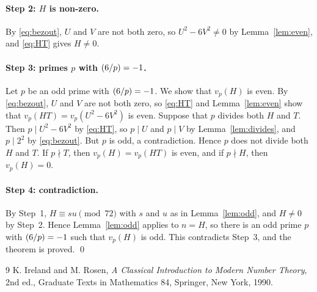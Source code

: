 \documentclass[11pt]{article}
\newcommand{\leg}[2]{\mathchoice{\biggl(\dfrac{#1}{#2}\biggr)}{(#1/#2)}{(#1/#2)}{(#1/#2)}}
\begin{document}
\paragraph{Step 2: $H$ is non-zero.} By \eqref{eq:bezout}, $U$ and $V$ are not both zero, so $U^2-6V^2\neq0$ by Lemma~\ref{lem:even}, and \eqref{eq:HT} gives $H\neq0$.

\paragraph{\texorpdfstring{Step 3: primes $p$ with $\leg{6}{p}=-1$.}{Step 3: inert primes.}} Let $p$ be an odd prime with $\leg{6}{p}=-1$. We show that $v_p(H)$ is even. By \eqref{eq:bezout}, $U$ and $V$ are not both zero, so \eqref{eq:HT} and Lemma~\ref{lem:even} show that $v_p(HT)=v_p(U^2-6V^2)$ is even. Suppose that $p$ divides both $H$ and $T$. Then $p\mid U^2-6V^2$ by \eqref{eq:HT}, so $p\mid U$ and $p\mid V$ by Lemma~\ref{lem:divides}, and $p\mid 2^{2}$ by \eqref{eq:bezout}. But $p$ is odd, a contradiction. Hence $p$ does not divide both $H$ and $T$. If $p\nmid T$, then $v_p(H)=v_p(HT)$ is even, and if $p\nmid H$, then $v_p(H)=0$.

\paragraph{Step 4: contradiction.} By Step~1, $H\equiv su\pmod{72}$ with $s$ and $u$ as in Lemma~\ref{lem:odd}, and $H\neq0$ by Step~2. Hence Lemma~\ref{lem:odd} applies to $n=H$, so there is an odd prime $p$ with $\leg{6}{p}=-1$ such that $v_p(H)$ is odd. This contradicts Step~3, and the theorem is proved.
\qed

\begin{thebibliography}{9}
 K. Ireland and M. Rosen, \emph{A Classical Introduction to Modern Number Theory}, 2nd ed., Graduate Texts in Mathematics 84, Springer, New York, 1990.
\end{thebibliography}
\end{document}

